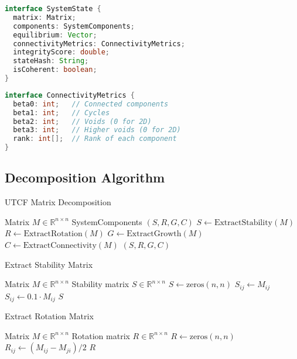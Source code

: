 \documentclass[11pt,a4paper]{article}
\theoremstyle{definition}
\theoremstyle{remark}
\newcommand{\R}{\mathbb{R}}
\begin{document}
\begin{lstlisting}[language=Java, caption=System State Interface]
interface SystemState {
  matrix: Matrix;
  components: SystemComponents;
  equilibrium: Vector;
  connectivityMetrics: ConnectivityMetrics;
  integrityScore: double;
  stateHash: String;
  isCoherent: boolean;
}
\end{lstlisting}

\begin{lstlisting}[language=Java, caption=Connectivity Metrics Interface]
interface ConnectivityMetrics {
  beta0: int;   // Connected components
  beta1: int;   // Cycles
  beta2: int;   // Voids (0 for 2D)
  beta3: int;   // Higher voids (0 for 2D)
  rank: int[];  // Rank of each component
}
\end{lstlisting}

\subsection{Decomposition Algorithm}

\begin{algorithm}
\caption{UTCF Matrix Decomposition}\label{alg:decompose}
\begin{algorithmic}[1]
\Require Matrix $M \in \R^{n \times n}$
\Ensure SystemComponents $(S, R, G, C)$
\State $S \gets \text{ExtractStability}(M)$
\State $R \gets \text{ExtractRotation}(M)$
\State $G \gets \text{ExtractGrowth}(M)$
\State $C \gets \text{ExtractConnectivity}(M)$
\State \Return $(S, R, G, C)$
\end{algorithmic}
\end{algorithm}

\begin{algorithm}
\caption{Extract Stability Matrix}\label{alg:stability}
\begin{algorithmic}[1]
\Require Matrix $M \in \R^{n \times n}$
\Ensure Stability matrix $S \in \R^{n \times n}$
\State $S \gets \text{zeros}(n, n)$
      \State $S_{ij} \gets M_{ij}$
    \Else
      \State $S_{ij} \gets 0.1 \cdot M_{ij}$
    \EndIf
  \EndFor
\EndFor
\State \Return $S$
\end{algorithmic}
\end{algorithm}

\begin{algorithm}
\caption{Extract Rotation Matrix}\label{alg:rotation}
\begin{algorithmic}[1]
\Require Matrix $M \in \R^{n \times n}$
\Ensure Rotation matrix $R \in \R^{n \times n}$
\State $R \gets \text{zeros}(n, n)$
    \State $R_{ij} \gets (M_{ij} - M_{ji}) / 2$
  \EndFor
\EndFor
\State \Return $R$
\end{algorithmic}
\end{algorithm}
\end{document}
